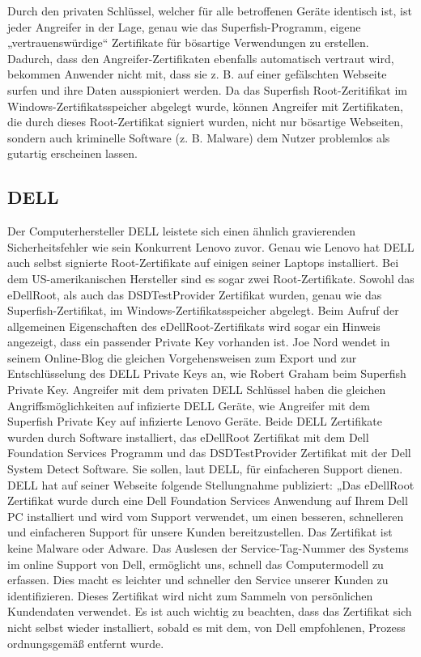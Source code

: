 Durch den privaten Schlüssel, welcher für alle betroffenen Geräte identisch ist, ist jeder Angreifer in der Lage, genau wie das Superfish-Programm, eigene „vertrauenswürdige“ Zertifikate für bösartige Verwendungen zu erstellen. Dadurch, dass den Angreifer-Zertifikaten ebenfalls automatisch vertraut wird, bekommen Anwender nicht mit, dass sie z. B. auf einer gefälschten Webseite surfen und ihre Daten ausspioniert werden. Da das Superfish Root-Zeritifikat im Windows-Zertifikatsspeicher abgelegt wurde, können Angreifer mit Zertifikaten, die durch dieses Root-Zertifikat signiert wurden, nicht nur bösartige Webseiten, sondern auch kriminelle Software (z. B. Malware) dem Nutzer problemlos als gutartig erscheinen lassen.

\subsection{DELL}
Der Computerhersteller DELL leistete sich einen ähnlich gravierenden Sicherheitsfehler wie sein Konkurrent Lenovo zuvor. Genau wie Lenovo hat DELL auch selbst signierte Root-Zertifikate auf einigen seiner Laptops installiert. Bei dem US-amerikanischen Hersteller sind es sogar zwei Root-Zertifikate. Sowohl das eDellRoot, als auch das DSDTestProvider Zertifikat wurden, genau wie das Superfish-Zertifikat, im Windows-Zertifikatsspeicher abgelegt. Beim Aufruf der allgemeinen Eigenschaften des eDellRoot-Zertifikats wird sogar ein Hinweis angezeigt, dass ein passender Private Key vorhanden ist. Joe Nord wendet in seinem Online-Blog die gleichen Vorgehensweisen zum Export und zur Entschlüsselung des DELL Private Keys an, wie Robert Graham beim Superfish Private Key. %
Angreifer mit dem privaten DELL Schlüssel haben die gleichen Angriffsmöglichkeiten auf infizierte DELL Geräte, wie Angreifer mit dem Superfish Private Key auf infizierte Lenovo Geräte.
Beide DELL Zertifikate wurden durch Software installiert, das eDellRoot Zertifikat mit dem Dell Foundation Services Programm und das DSDTestProvider Zertifikat mit der Dell System Detect Software. 
Sie sollen, laut DELL, für einfacheren Support dienen. 
DELL hat auf seiner Webseite folgende Stellungnahme publiziert: „Das eDellRoot Zertifikat wurde durch eine Dell Foundation Services Anwendung auf Ihrem Dell PC installiert und wird vom Support verwendet, um einen besseren, schnelleren und einfacheren Support für unsere Kunden bereitzustellen. Das Zertifikat ist keine Malware oder Adware. Das Auslesen der Service-Tag-Nummer des Systems im online Support von Dell, ermöglicht uns, schnell das Computermodell zu erfassen. Dies macht es leichter und schneller den Service unserer Kunden zu identifizieren. Dieses Zertifikat wird nicht zum Sammeln von persönlichen Kundendaten verwendet. Es ist auch wichtig zu beachten, dass das Zertifikat sich nicht selbst wieder installiert, sobald es mit dem, von Dell empfohlenen, Prozess ordnungsgemäß entfernt wurde. %
